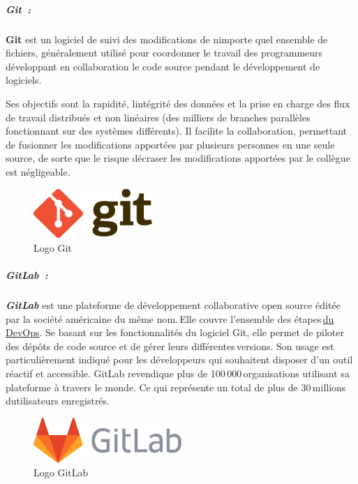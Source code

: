 \documentclass[12pt,a4paper,twoside]{report}
\begin{document}
\hypertarget{git}{%
\subparagraph{Git~:}\label{git}}

\textbf{Git} est un logiciel de suivi des modifications de
n\textquotesingle importe quel ensemble de fichiers, généralement
utilisé pour coordonner le travail des programmeurs développant en
collaboration le code source pendant le développement de logiciels.

Ses objectifs sont la rapidité, l\textquotesingle intégrité des données
et la prise en charge des flux de travail distribués et non linéaires
(des milliers de branches parallèles fonctionnant sur des systèmes
différents). Il facilite la collaboration, permettant de fusionner les
modifications apportées par plusieurs personnes en une seule source, de
sorte que le risque d\textquotesingle écraser les modifications
apportées par le collègue est négligeable.

\begin{figure}[H]
\centering
\includegraphics[width=0.4\textwidth]{latex_media/media/image29.png}
\caption{Logo Git}
\label{fig:logo-git}
\end{figure}

\hypertarget{gitlab}{%
\subparagraph{GitLab~:}\label{gitlab}}

\emph{\textbf{GitLab}} est une plateforme de développement collaborative
open source éditée par la société américaine du même nom.\,Elle couvre
l'ensemble des
étapes\,\href{https://www.journaldunet.fr/web-tech/guide-de-l-entreprise-digitale/1443818-devops-tout-savoir-sur-la-demarche-des-outils-au-metier/}{du
DevOps}. Se basant sur les fonctionnalités du logiciel Git, elle permet
de piloter des dépôts de code source et de gérer leurs
différentes\,versions. Son usage est particulièrement indiqué pour les
développeurs qui souhaitent disposer d'un outil réactif et accessible.
GitLab revendique plus de 100\,000\,organisations utilisant sa
plateforme à travers le monde. Ce qui représente un total de plus de
30\,millions d\textquotesingle utilisateurs enregistrés.

\begin{figure}[H]
\centering
\includegraphics[width=0.5\textwidth]{latex_media/media/image30.png}
\caption{Logo GitLab}
\label{fig:logo-gitlab}
\end{figure}
\end{document}
